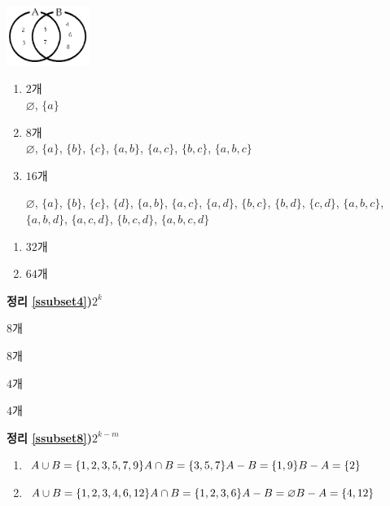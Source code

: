 \documentclass{oblivoir}
\begin{document}
\begin{multicols*}{2}
%
\four

\columnbreak

%
\begin{center}
\includegraphics[width=0.2\textwidth]{subset_4}
\end{center}

%
\begin{enumerate}
\item
\(2\)개\\
\(\varnothing\), \(\{a\}\)
\item
\(8\)개\\
\(\varnothing\), \(\{a\}\), \(\{b\}\), \(\{c\}\),
\(\{a,b\}\), \(\{a,c\}\), \(\{b,c\}\), \(\{a,b,c\}\)
\item
\(16\)개\\
{\raggedright
\(\varnothing\), \(\{a\}\), \(\{b\}\), \(\{c\}\), \(\{d\}\),
\(\{a,b\}\), \(\{a,c\}\), \(\{a,d\}\),  \(\{b,c\}\),  \(\{b,d\}\), \(\{c,d\}\),
\(\{a,b,c\}\), \(\{a,b,d\}\), \(\{a,c,d\}\), \(\{b,c,d\}\), \(\{a,b,c,d\}\)}
\end{enumerate}

%
\begin{enumerate}
\item
\(32\)개
\item
\(64\)개
\end{enumerate}

%
\par\bigskip\noindent\textbf{정리 \ref{ssubset4})}\:\:\(2^k\)\par\medskip\noindent

%

%
\begin{enumerate*}[itemjoin={,\:}]
\item \(8\)개
\item \(8\)개
\item \(4\)개
\item \(4\)개
\end{enumerate*}

%
\par\bigskip\noindent\textbf{정리 \ref{ssubset8})}\:\:\(2^{k-m}\)\par\medskip\noindent

%
\begin{enumerate}
\item
\(
A\cup B=\{1,2,3,5,7,9\}\\
A\cap B=\{3,5,7\}\\
A-B=\{1,9\}\\
B-A=\{2\}
\)
\item
\(
A\cup B=\{1,2,3,4,6,12\}\\
A\cap B=\{1,2,3,6\}\\
A-B=\varnothing\\
B-A=\{4,12\}
\)
\end{enumerate}


\end{multicols*}
\end{document}
